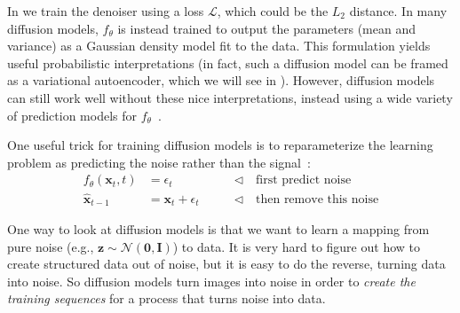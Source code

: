 In \algref{\ref{alg:generative_models:diffusion_model}} we train the denoiser using a loss $\mathcal{L}$, which could be the $L_2$ distance. In many diffusion models, $f_{\theta}$ is instead trained to output the parameters (mean and variance) as a Gaussian density model fit to the data. This formulation yields useful probabilistic interpretations (in fact, such a diffusion model can be framed as a variational autoencoder, which we will see in \chap{\ref{chapter:generative_modeling_and_representation_learning}}). However, diffusion models can still work well without these nice interpretations, instead using a wide variety of prediction models for $f_{\theta}$~\cite{bansal2022cold}.



One useful trick for training diffusion models is to reparameterize the learning problem as predicting the noise rather than the signal~\cite{ho2020denoising}:
\begin{align}
    f_{\theta}(\mathbf{x}_t, t) &= \epsilon_t &\quad\quad \triangleleft \quad\text{first predict noise}\\
    \hat{\mathbf{x}}_{t-1} &= \mathbf{x}_t + \epsilon_t &\quad\quad \triangleleft \quad\text{then remove this noise}
\end{align}

One way to look at diffusion models is that we want to learn a mapping from pure noise (e.g., $\mathbf{z} \sim \mathcal{N}(\mathbf{0},\mathbf{I})$) to data. It is very hard to figure out how to create structured data out of noise, but it is easy to do the reverse, turning data into noise. So diffusion models turn images into noise in order to \textit{create the training sequences} for a process that turns noise into data.

